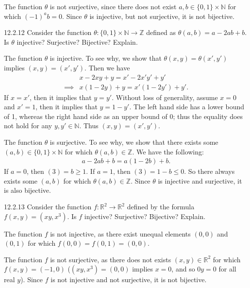 \documentclass{exam}
\begin{document}
The function $\theta$ is not surjective, since there does not exist $a, b\in\{0, 1\}\times\mathbb N$ for which $(-1)^ab = 0$. Since $\theta$ is injective, but not surjective, it is not bijective.

\begin{problem}{12.2.12}
    Consider the function $\theta:\{0, 1\}\times\mathbb N\rightarrow\mathbb Z$ defined as $\theta(a,b)=a-2ab+b$. Is $\theta$ injective? Surjective? Bijective? Explain.
\end{problem}

The function $\theta$ is injective. To see why, we show that $\theta(x, y) = \theta(x', y')$ implies $(x, y) = (x', y')$. Then we have
\begin{align*}
    &x-2xy+y = x'-2x'y'+y'\\
    \implies&x(1-2y)+y = x'(1-2y') + y'.
\end{align*}
If $x=x'$, then it implies that $y=y'$. Without loss of generality, assume $x = 0$ and $x' = 1$, then it implies that $y = 1-y'$. The left hand side has a lower bound of 1, whereas the right hand side as an upper bound of 0; thus the equality does not hold for any $y, y'\in\mathbb N$. Thus $(x, y) = (x', y')$.

The function $\theta$ is surjective. To see why, we show that there exists some $(a, b)\in\{0, 1\}\times\mathbb N$ for which $\theta(a, b)\in\mathbb Z$. We have the following:
\begin{align}
    a-2ab+b = a(1-2b) + b.
\end{align}
If $a = 0$, then $(3) = b \ge 1$. If $a = 1$, then $(3)= 1 - b \le 0$. So there always exists some $(a, b)$ for which $\theta(a, b)\in\mathbb Z$. Since $\theta$ is injective and surjective, it is also bijective.

\begin{problem}{12.2.13}
    Consider the function $f:\mathbb R^2\rightarrow\mathbb R^2$ defined by the formula $f(x, y) = (xy, x^3)$. Is $f$ injective? Surjective? Bijective? Explain.
\end{problem}

The function $f$ is not injective, as there exist unequal elements $(0, 0)$ and $(0, 1)$ for which $f(0, 0) = f(0, 1) = (0, 0)$.

The function $f$ is not surjective, as there does not exists $(x, y)\in\mathbb R^2$ for which $f(x, y) = (-1, 0)$ ($(xy, x^3) = (0, 0)$ implies $x = 0$, and so $0y = 0$ for all real $y$). Since $f$ is not injective and not surjective, it is not bijective.
\end{document}

